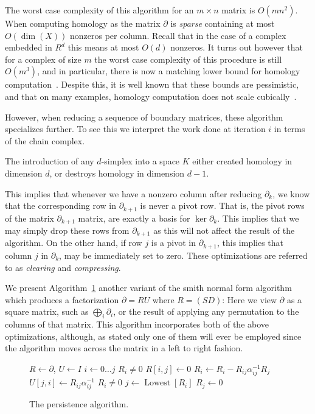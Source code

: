 The worst case complexity of this algorithm for an $m \times n$ matrix is $O(mn^2)$. When computing homology as the matrix $\partial$ is \emph{sparse} containing at most $O(\operatorname{dim}{(X)})$ nonzeros per column. Recall that in the case of a complex embedded in $R^d$ this means at most $O(d)$ nonzeros. It turns out however that for a complex of size $m$ the worst case complexity of this procedure is still $O(m^3)$, and in particular, there is now a matching lower bound for homology computation~\cite{parsa}. Despite this, it is well known that these bounds are pessimistic, and that on many examples, homology computation does not scale cubically~\cite{elz-tps-02}. 

However, when reducing a sequence of boundary matrices, these algorithm specializes further. To see this we interpret the work done at iteration $i$ in terms of the chain complex. 
\begin{lemma}
The introduction of any $d$-simplex into a space $K$ either created homology in dimension $d$, or destroys homology in dimension $d-1$.
\end{lemma}
This implies that whenever we have a nonzero column after reducing $\partial_k$, we know that the corresponding row in $\partial_{k+1}$ is never a pivot row. That is, the pivot rows of the matrix $\partial_{k+1}$ matrix, are exactly a basis for $\ker{\partial_k}$. This implies that we may simply drop these rows from $\partial_{k+1}$ as this will not affect the result of the algorithm. On the other hand, if row $j$ is a pivot in $\partial_{k+1}$, this implies that column $j$ in $\partial_k$, may be immediately set to zero. These optimizations are referred to as \emph{clearing} and \emph{compressing}.

We present Algorithm~\ref{alg:elz} another variant of the smith normal form algorithm which produces a factorization $\partial = RU$ where $R = (SD)$: Here we view $\partial$ as a square matrix, such as $\bigoplus_i \partial_i$, or the result of applying any permutation to the columns of that matrix. This algorithm incorporates both of the above optimizations, although, as stated only one of them will ever be employed since the algorithm moves across the matrix in a left to right fashion.
\begin{figure}[h]
\begin{codebox}
\li $R \gets \partial$, $U \gets I$
\li {}
\li \Do \For $i \gets 0 \ldots j$ 
\li \Do  \If $R_i \neq 0$ 
\li \Then $R[i,j] \gets 0$
\End
\li \Do {}
\li \Do
\li   $R_i \gets R_i - R_{ij}\alpha^{-1}_{ij}R_j$
\li   $U[j,i] \gets R_{ij}\alpha^{-1}_{ij}$
    \End
\li \If $R_i \neq 0$
\li \Then 
\li $j \gets \operatorname{Lowest}[R_i]$
\li $R_{j} \gets 0$
\End
\End
\end{codebox}
\caption{The persistence algorithm.}
\label{alg:elz}
\end{figure}

